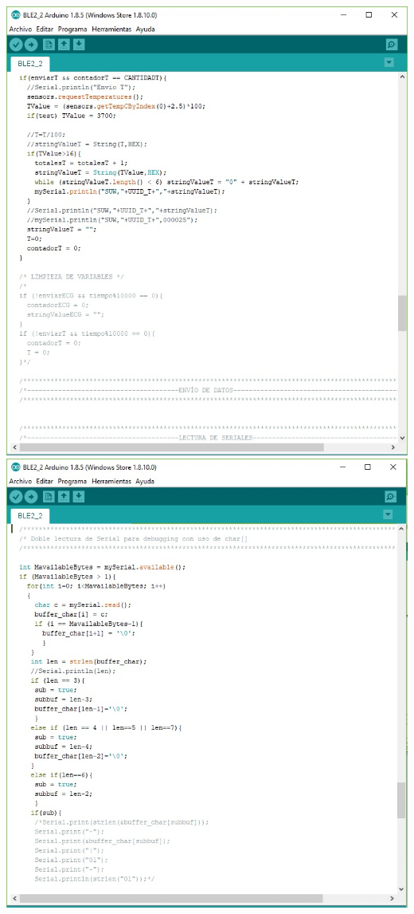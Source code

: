 \includegraphics[width=1\textwidth]{figura/anexos/code7.jpg}
\includegraphics[width=1\textwidth]{figura/anexos/code8.jpg}
